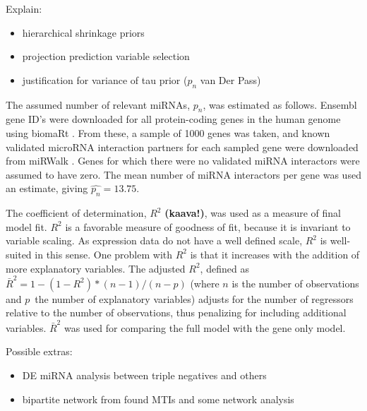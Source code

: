 Explain:
\begin{itemize}
  \item hierarchical shrinkage priors
  \item projection prediction variable selection
  \item justification for variance of tau prior ($p_n$ van Der Pass)
\end{itemize}

The assumed number of relevant miRNAs, $p_n$, was estimated as follows.
Ensembl gene ID's were downloaded for all protein-coding genes in the human
genome using biomaRt \citep{biomaRt}. From these, a sample of 1000 genes was
taken, and known validated microRNA interaction partners for each sampled gene
were downloaded from miRWalk \citep{Dweep2015}. Genes for which there were no
validated miRNA interactors were assumed to have zero. The mean number of
miRNA interactors per gene was used an estimate, giving
$\hat{p_n} = 13.75$.

The coefficient of determination, $R^2$ \textbf{(kaava!)}, was used as a measure of final model
fit. $R^2$ is a favorable measure of goodness of fit, because it is invariant
to variable scaling. As expression data do not have a well defined scale,
$R^2$ is well-suited in this sense. One problem with $R^2$ is that it
increases with the addition of more explanatory variables. The adjusted $R^2$,
defined as $\bar{R}^2 = 1-(1-R^2)*(n-1)/(n-p)$ (where $n$ is the number of
observations and $p$ the number of explanatory variables) adjusts for the
number of regressors relative to the number of observations, thus penalizing
for including additional variables. $\bar{R}^2$ was used for comparing the
full model with the gene only model.

Possible extras:
\begin{itemize}
	\item DE miRNA analysis between triple negatives and others
	\item bipartite network from found MTIs and some network analysis
\end{itemize}
